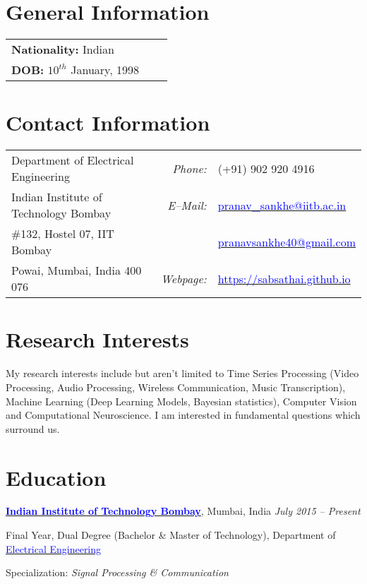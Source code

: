 \documentclass[margin,line, 9pt]{res}
\newenvironment{list1}{
  \begin{list}{\ding{113}}{%
      \setlength{\itemsep}{0in}
      \setlength{\parsep}{0in} \setlength{\parskip}{0in}
      \setlength{\topsep}{0in} \setlength{\partopsep}{0in} 
      \setlength{\leftmargin}{0.17in}}}{\end{list}}
\begin{document}
% 
% 
% 
\begin{resume}

\section{\sc General Information}
\vspace{0.05in}
\begin{tabular}{@{}p{2.9in}p{.5in}p{3in}}
\textbf{Nationality:} Indian \\ 
\textbf{DOB:} $10^{th}$ January, 1998
\end{tabular}

\section{\sc Contact Information}
\vspace{.05in}
\begin{tabular}{@{}p{2.9in}p{.5in}p{3in}}
Department of Electrical Engineering & \multicolumn{1}{r}{\it Phone:}  &(+91) 902 920 4916 \\            
Indian Institute of Technology Bombay &\multicolumn{1}{r}{\it E--Mail:}& \href{mailto:pranav_sankhe@iitb.ac.in}{\textcolor{blue}{pranav\_sankhe@iitb.ac.in}} \\ 
\#132, Hostel 07, IIT Bombay & & \href{mailto:pranavsankhe40@gmail.com}{\textcolor{blue}{pranavsankhe40@gmail.com}} \\ 
Powai, Mumbai, India 400 076 & \multicolumn{1}{r}{\it Webpage:} &\href{https://sabsathai.github.io}{\textcolor{blue}{https://sabsathai.github.io}} \\     
\end{tabular}
% 
\section{\sc Research Interests}
My research interests include but aren't limited to Time Series Processing (Video Processing, Audio Processing, Wireless Communication, Music Transcription), Machine Learning (Deep Learning Models, Bayesian statistics), Computer Vision and Computational Neuroscience. I am interested in fundamental questions which surround us.
% 
\section{\sc Education}
{\bf \href{http://www.iitb.ac.in/}{\textcolor{blue}{Indian Institute of Technology Bombay}}}, Mumbai, India \hfill {\it July 2015 -- Present} \\
\vspace*{-.13in}
\begin{list1}
\item[] Final Year, Dual Degree (Bachelor \& Master of Technology), Department of \href{http://www.ee.iitb.ac.in/}{\textcolor{blue}{Electrical Engineering}}
\item[] Specialization: {\em Signal Processing \& Communication}
\end{list1}
% 

\end{resume}
\end{document}
